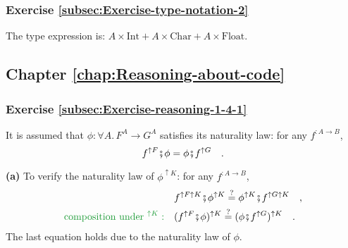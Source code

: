 \subsubsection*{Exercise \ref{subsec:Exercise-type-notation-2}}

The type expression is: $A\times\text{Int}+A\times\text{Char}+A\times\text{Float}$.

\subsection*{Chapter \ref{chap:Reasoning-about-code}}

\subsubsection*{Exercise \ref{subsec:Exercise-reasoning-1-4-1}}

It is assumed that $\phi:\forall A.\,F^{A}\rightarrow G^{A}$ satisfies
its naturality law: for any $f^{:A\rightarrow B}$,
\[
f^{\uparrow F}\bef\phi=\phi\bef f^{\uparrow G}\quad.
\]

\textbf{(a)} To verify the naturality law of $\phi^{\uparrow K}$:
for any $f^{:A\rightarrow B}$,
\begin{align*}
 & f^{\uparrow F\uparrow K}\bef\phi^{\uparrow K}\overset{?}{=}\phi^{\uparrow K}\bef f^{\uparrow G\uparrow K}\quad,\\
{\color{greenunder}\text{composition under }^{\uparrow K}:}\quad & (f^{\uparrow F}\bef\phi)^{\uparrow K}\overset{?}{=}(\phi\bef f^{\uparrow G})^{\uparrow K}\quad.
\end{align*}
The last equation holds due to the naturality law of $\phi$.

